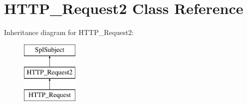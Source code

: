 \hypertarget{classHTTP__Request2}{\section{H\-T\-T\-P\-\_\-\-Request2 Class Reference}
\label{classHTTP__Request2}
}
Inheritance diagram for H\-T\-T\-P\-\_\-\-Request2\-:\begin{figure}[H]
\begin{center}
\leavevmode
\includegraphics[height=3.000000cm]{classHTTP__Request2}
\end{center}
\end{figure}

